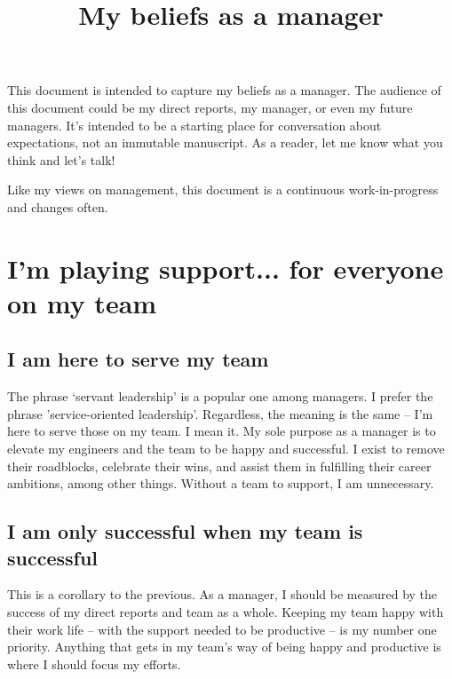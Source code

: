 \documentclass[11pt]{amsart}
\title{My beliefs as a manager}
\begin{document}
\thispagestyle{empty}



\maketitle

This document is intended to capture my beliefs as a manager. The audience of this document could be my direct reports, my manager, or even my future managers. It's intended to be a starting place for conversation about expectations, not an immutable manuscript. As a reader, let me know what you think and let's talk! 

Like my views on management, this document is a continuous work-in-progress and changes often.

\section{I'm playing support... for everyone on my team} %
\subsection{I am here to serve my team}
The phrase ‘servant leadership’ is a popular one among managers. I prefer the phrase 'service-oriented leadership'. Regardless, the meaning is the same -- I'm here to serve those on my team. I mean it. My sole purpose as a manager is to elevate my engineers and the team to be happy and successful. I exist to remove their roadblocks, celebrate their wins, and assist them in fulfilling their career ambitions, among other things. Without a team to support, I am unnecessary.

\subsection{I am only successful when my team is successful}
This is a corollary to the previous. As a manager, I should be measured by the success of my direct reports and team as a whole. Keeping my team  happy with their work life -- with the support needed to be productive -- is my number one priority. Anything that gets in my team's way of being happy and productive is where I should focus my efforts.
\end{document}
